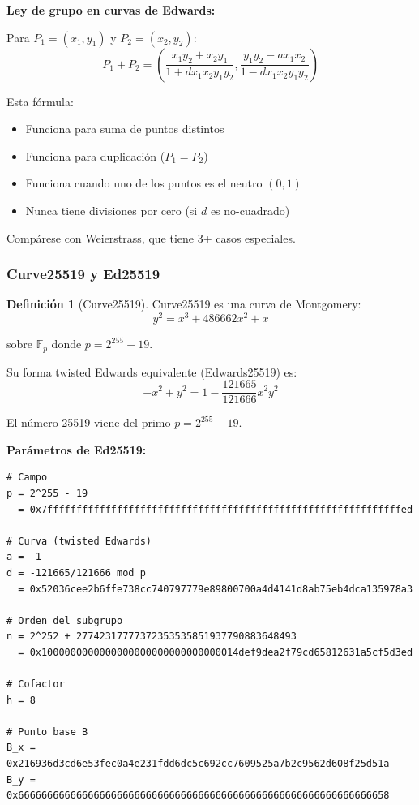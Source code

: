 \documentclass[11pt,a4paper,twoside,openright]{book}
\theoremstyle{definition}
\newtheorem{definition}{Definición}[chapter]
\theoremstyle{plain}
\theoremstyle{remark}
\begin{document}
\begin{mathnote}
\textbf{Ley de grupo en curvas de Edwards:}

Para $P_1 = (x_1, y_1)$ y $P_2 = (x_2, y_2)$:
\[ P_1 + P_2 = \left( \frac{x_1 y_2 + x_2 y_1}{1 + d x_1 x_2 y_1 y_2}, \frac{y_1 y_2 - a x_1 x_2}{1 - d x_1 x_2 y_1 y_2} \right) \]

Esta fórmula:
\begin{itemize}
    \item Funciona para suma de puntos distintos
    \item Funciona para duplicación ($P_1 = P_2$)
    \item Funciona cuando uno de los puntos es el neutro $(0, 1)$
    \item Nunca tiene divisiones por cero (si $d$ es no-cuadrado)
\end{itemize}

Compárese con Weierstrass, que tiene 3+ casos especiales.
\end{mathnote}

\subsubsection{Curve25519 y Ed25519}

\begin{definition}[Curve25519]
Curve25519 es una curva de Montgomery:
\[ y^2 = x^3 + 486662x^2 + x \]

sobre $\mathbb{F}_p$ donde $p = 2^{255} - 19$.

Su forma twisted Edwards equivalente (Edwards25519) es:
\[ -x^2 + y^2 = 1 - \frac{121665}{121666} x^2 y^2 \]

El número 25519 viene del primo $p = 2^{255} - 19$.
\end{definition}

\begin{mathnote}
\textbf{Parámetros de Ed25519:}

\begin{verbatim}
# Campo
p = 2^255 - 19
  = 0x7fffffffffffffffffffffffffffffffffffffffffffffffffffffffffffffed

# Curva (twisted Edwards)
a = -1
d = -121665/121666 mod p
  = 0x52036cee2b6ffe738cc740797779e89800700a4d4141d8ab75eb4dca135978a3

# Orden del subgrupo
n = 2^252 + 27742317777372353535851937790883648493
  = 0x1000000000000000000000000000000014def9dea2f79cd65812631a5cf5d3ed

# Cofactor
h = 8

# Punto base B
B_x = 0x216936d3cd6e53fec0a4e231fdd6dc5c692cc7609525a7b2c9562d608f25d51a
B_y = 0x6666666666666666666666666666666666666666666666666666666666666658
\end{verbatim}
\end{mathnote}
\end{document}
